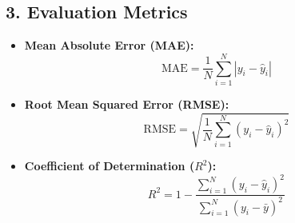 \documentclass[12pt,a4paper]{article}
\begin{document}
\subsection*{3. Evaluation Metrics}
\begin{itemize}
    \item \textbf{Mean Absolute Error (MAE):}
    \begin{equation}
        \text{MAE} = \frac{1}{N} \sum_{i=1}^N \left| y_i - \hat{y}_i \right|
    \end{equation}
    \item \textbf{Root Mean Squared Error (RMSE):}
    \begin{equation}
        \text{RMSE} = \sqrt{\frac{1}{N} \sum_{i=1}^N \left( y_i - \hat{y}_i \right)^2}
    \end{equation}
    \item \textbf{Coefficient of Determination ($R^2$):}
    \begin{equation}
        R^2 = 1 - \frac{\sum_{i=1}^N (y_i - \hat{y}_i)^2}{\sum_{i=1}^N (y_i - \bar{y})^2}
    \end{equation}
\end{itemize}
\end{document}

